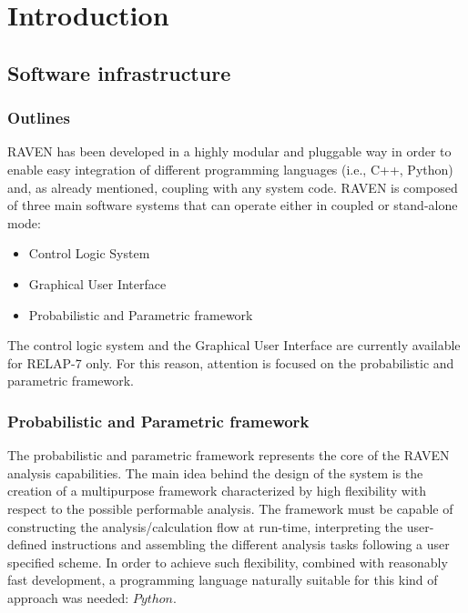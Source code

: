\section{Introduction}



\subsection{Software infrastructure}
\subsubsection{Outlines}
RAVEN has been developed in a highly modular and pluggable way in order to enable easy integration of different programming languages (i.e., C++, Python) and, as already mentioned, coupling with any system code.
RAVEN is composed of three main software systems that can operate either in coupled or stand-alone mode:
\begin{itemize}
  \item Control Logic System
  \item Graphical User Interface
  \item Probabilistic and Parametric framework
\end{itemize}
The control logic system and the Graphical User Interface are currently available for RELAP-7 only. For this reason, attention is focused on the probabilistic and parametric framework.

\subsubsection{Probabilistic and Parametric framework}
The probabilistic and parametric framework represents the core of the RAVEN analysis capabilities. The main idea behind the design of the system is the creation of a multipurpose framework characterized by high flexibility with respect to the possible performable analysis. The framework must be capable of constructing the analysis/calculation flow at run-time, interpreting the user-defined instructions and assembling the different analysis tasks following a user specified scheme.
In order to achieve such flexibility, combined with reasonably fast development, a programming language naturally suitable for this kind of approach was needed: $Python$.


